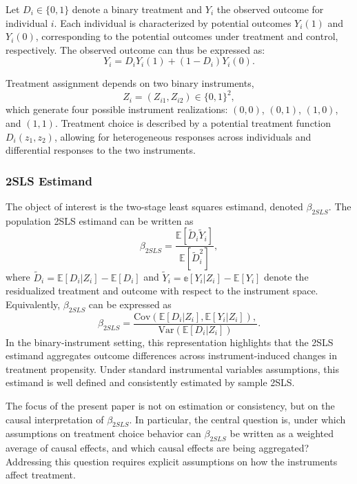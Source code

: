\documentclass[
  12pt,
  a4paper,
  oneside]{article}
\begin{document}
Let \(D_i \in \{0,1\}\) denote a binary treatment and \(Y_i\) the
observed outcome for individual \(i\). Each individual is characterized
by potential outcomes \(Y_i(1)\) and \(Y_i(0)\), corresponding to the
potential outcomes under treatment and control, respectively. The
observed outcome can thus be expressed as: \begin{equation}
Y_i = D_i Y_i(1) + (1 - D_i) Y_i(0).
\end{equation}

Treatment assignment depends on two binary instruments, \begin{equation}
Z_i = (Z_{i1}, Z_{i2}) \in \{0,1\}^2,
\end{equation} which generate four possible instrument realizations:
\((0,0)\), \((0,1)\), \((1,0)\), and \((1,1)\). Treatment choice is
described by a potential treatment function \(D_i(z_1, z_2)\), allowing
for heterogeneous responses across individuals and differential
responses to the two instruments.

\subsubsection{2SLS Estimand}\label{sls-estimand}

The object of interest is the two-stage least squares estimand, denoted
\(\beta_{2SLS}\). The population 2SLS estimand can be written as
\begin{equation}
\beta_{2SLS} = \frac{\mathbb{E}[\tilde{D}_i\tilde{Y}_i]}{\mathbb{E}[\tilde{D}_i^2]},
\end{equation} where
\(\tilde{D}_i = \mathbb{E}[D_i|Z_i] - \mathbb{E}[D_i]\) and
\(\tilde{Y}_i = \mathbb{e}[Y_i|Z_i] - \mathbb{E}[Y_i]\) denote the
residualized treatment and outcome with respect to the instrument space.
Equivalently, \(\beta_{2SLS}\) can be expressed as \begin{equation}
\beta_{2SLS} = \frac{\text{Cov}(\mathbb{E}[D_i|Z_i], \mathbb{E}[Y_i|Z_i]),}{\text{Var}(\mathbb{E}[D_i|Z_i])}.
\end{equation} In the binary-instrument setting, this representation
highlights that the 2SLS estimand aggregates outcome differences across
instrument-induced changes in treatment propensity. Under standard
instrumental variables assumptions, this estimand is well defined and
consistently estimated by sample 2SLS.

The focus of the present paper is not on estimation or consistency, but
on the causal interpretation of \(\beta_{2SLS}\). In particular, the
central question is, under which assumptions on treatment choice
behavior can \(\beta_{2SLS}\) be written as a weighted average of causal
effects, and which causal effects are being aggregated? Addressing this
question requires explicit assumptions on how the instruments affect
treatment.
\end{document}
